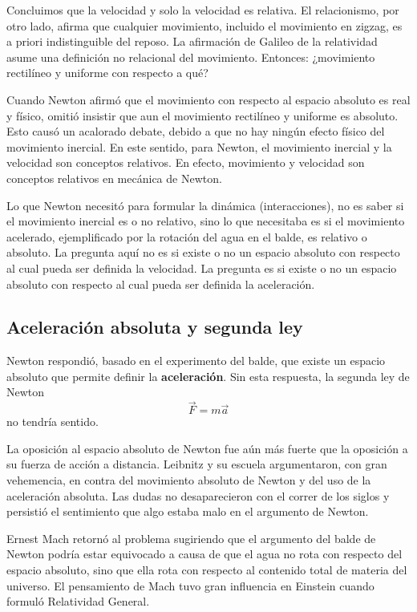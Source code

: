 \documentclass[../apunte_mecanica_clasica.tex]{subfiles}%
\begin{document}
Concluimos que la velocidad y solo la velocidad es relativa. El relacionismo, por otro lado, afirma que cualquier movimiento, incluido el movimiento en zigzag, es a priori indistinguible del reposo. La afirmación de Galileo de la relatividad asume una definición no relacional del movimiento. Entonces: ¿movimiento rectilíneo y uniforme con respecto a qué?

Cuando Newton afirmó que el movimiento con respecto al espacio absoluto es real y físico, omitió insistir que aun el movimiento rectilíneo y uniforme es absoluto. Esto causó un acalorado debate, debido a que no hay ningún efecto físico del movimiento inercial. En este sentido, para Newton, el movimiento inercial y la velocidad son conceptos relativos. En efecto, movimiento y velocidad son conceptos relativos en mecánica de Newton.

Lo que Newton necesitó para formular la dinámica (interacciones), no es saber si el movimiento inercial es o no relativo, sino lo que necesitaba es si el movimiento acelerado, ejemplificado por la rotación del agua en el balde, es relativo o absoluto. La pregunta aquí no es si existe o no un espacio absoluto con respecto al cual pueda ser definida la velocidad. La pregunta es si existe o no un espacio absoluto con respecto al cual pueda ser definida la aceleración.

\subsection{Aceleración absoluta y segunda ley}

Newton respondió, basado en el experimento del balde, que existe un espacio absoluto que permite definir la \textbf{aceleración}. Sin esta respuesta, la segunda ley de Newton
\begin{equation*}
\vec F = m\vec a
\end{equation*}
no tendría sentido.

La oposición al espacio absoluto de Newton fue aún más fuerte que la oposición a su fuerza de acción a distancia. Leibnitz y su escuela argumentaron, con gran vehemencia, en contra del movimiento absoluto de Newton y del uso de la aceleración absoluta. Las dudas no desaparecieron con el correr de los siglos y persistió el sentimiento que algo estaba malo en el argumento de Newton.

Ernest Mach retornó al problema sugiriendo que el argumento del balde de Newton podría estar equivocado a causa de que el agua no rota con respecto del espacio absoluto, sino que ella rota con respecto al contenido total de materia del universo. El pensamiento de Mach tuvo gran influencia en Einstein cuando formuló Relatividad General.
\end{document}
